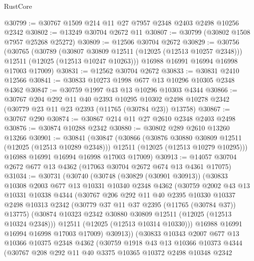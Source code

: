 \begin{lexlean}{RustCore}
\begin{coremodule}
@30799 := @30767 @1509 @214 @11 @27 @7957 @2348 @2403 @2498 @10256 @2342
@30802 := @13249 @30704 @2672 @11
@30807 := @30799 (@30802 @1508 @7957 @25268 @25272)
@30809 := @12506 @30704 @2672
@30829 := @30756
    (@30765
      (@30789
        (@30807 @30809 @12511 (@12025 (@12513 @10257 @2348)))
        @12511
        (@12025 (@12513 @10247 @10263)))
      @16988
      @16991
      @16994
      @16998
      @17003
      @17009)
@30831 := @12562 @30704 @2672
@30833 := @30831 @2410 @12566
@30841 := @30833 @10273 @1998 @677 @13 @10296 @10305 @2348 @4362
@30847 := @30759 @1997 @43 @13 @10296 @10303 @4344
@30866 := @30767
    @204
    @292
    @11
    @40
    @2393
    @10295
    @10302
    @2498
    @10278
    @2342
    (@30779 @23 @11 @23 @2393 (@11765 (@30784 @23)) @13758)
@30867 := @30767 @290
@30874 := @30867 @214 @11 @27 @2610 @2348 @2403 @2498
@30876 := @30874 @10288 @2342
@30880 := @30802 @289 @2610 @13260 @13266
@30901 := @30841
    (@30847
      (@30866
        (@30876 @30880 @30809 @12511 (@12025 (@12513 @10289 @2348)))
        @12511
        (@12025 (@12513 @10279 @10295)))
      @16988
      @16991
      @16994
      @16998
      @17003
      @17009)
@30913 := @14057 @30704 @2672 @677 @13 @4362 (@17063 @30704 @2672 @674 @13 @4361 @17075)
@31034 := @30731
    (@30740
      (@30748
        (@30829 (@30901 @30913))
        (@30833
          @10308
          @2003
          @677
          @13
          @10331
          @10340
          @2348
          @4362
          (@30759
            @2002
            @43
            @13
            @10331
            @10338
            @4344
            (@30767
              @206
              @292
              @11
              @40
              @2395
              @10330
              @10337
              @2498
              @10313
              @2342
              (@30779 @37 @11 @37 @2395 (@11765 (@30784 @37)) @13775)
              (@30874 @10323 @2342 @30880 @30809 @12511 (@12025 (@12513 @10324 @2348)))
              @12511
              (@12025 (@12513 @10314 @10330)))
            @16988
            @16991
            @16994
            @16998
            @17003
            @17009)
          @30913))
      (@30833
        @10343
        @2007
        @677
        @13
        @10366
        @10375
        @2348
        @4362
        (@30759
          @1918
          @43
          @13
          @10366
          @10373
          @4344
          (@30767
            @208
            @292
            @11
            @40
            @3375
            @10365
            @10372
            @2498
            @10348
            @2342

\end{coremodule}
\end{lexlean}
